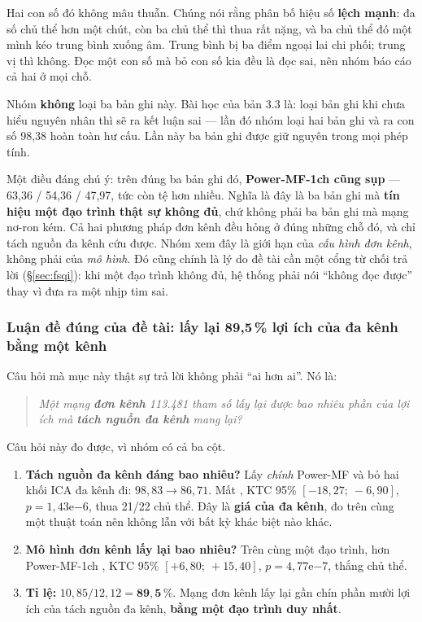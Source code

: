 Hai con số đó không mâu thuẫn. Chúng nói rằng phân bố hiệu số \textbf{lệch mạnh}: đa số chủ thể
\hethong{} hơn một chút, còn ba chủ thể thì thua rất nặng, và ba chủ thể đó một mình kéo trung bình
xuống âm. Trung bình bị ba điểm ngoại lai chi phối; trung vị thì không. Đọc một con số mà bỏ con số kia
đều là đọc sai, nên nhóm báo cáo cả hai ở mọi chỗ.

Nhóm \textbf{không} loại ba bản ghi này. Bài học của bản 3.3 là: loại bản ghi khi chưa hiểu nguyên nhân
thì sẽ ra kết luận sai --- lần đó nhóm loại hai bản ghi và ra con số 98,38 hoàn toàn hư cấu. Lần này ba
bản ghi được giữ nguyên trong mọi phép tính.

Một điều đáng chú ý: trên đúng ba bản ghi đó, \textbf{Power-MF-1ch cũng sụp} --- 63,36 / 54,36 / 47,97,
tức còn tệ hơn \hethong{} nhiều. Nghĩa là đây là ba bản ghi mà \textbf{tín hiệu một đạo trình thật sự
không đủ}, chứ không phải ba bản ghi mà mạng nơ-ron kém. Cả hai phương pháp đơn kênh đều hỏng ở đúng
những chỗ đó, và chỉ tách nguồn đa kênh cứu được. Nhóm xem đây là giới hạn của \textit{cấu hình đơn
kênh}, không phải của \textit{mô hình}. Đó cũng chính là lý do đề tài cần một cổng từ chối trả lời
(\S\ref{sec:fsqi}): khi một đạo trình không đủ, hệ thống phải nói ``không đọc được'' thay vì đưa ra một
nhịp tim sai.

\subsubsection{Luận đề đúng của đề tài: lấy lại 89,5\,\% lợi ích của đa kênh bằng một kênh}
\label{sec:luande}

Câu hỏi mà mục này thật sự trả lời không phải ``ai hơn ai''. Nó là:

\begin{quote}
\textit{Một mạng \textbf{đơn kênh} 113.481 tham số lấy lại được bao nhiêu phần của lợi ích mà
\textbf{tách nguồn đa kênh} mang lại?}
\end{quote}

Câu hỏi này đo được, vì nhóm có cả ba cột.

\begin{enumerate}[leftmargin=1.8em,itemsep=5pt]
\item \textbf{Tách nguồn đa kênh đáng bao nhiêu?} Lấy \textit{chính} Power-MF và bỏ hai khối ICA đa kênh
đi: $98{,}83 \rightarrow 86{,}71$. Mất , KTC 95\% $[-18{,}27;\ -6{,}90]$,
$p = 1{,}43\mathrm{e}{-6}$, thua 21/22 chủ thể. Đây là \textbf{giá của đa kênh}, đo trên cùng một thuật
toán nên không lẫn với bất kỳ khác biệt nào khác.
\item \textbf{Mô hình đơn kênh lấy lại bao nhiêu?} Trên cùng một đạo trình, \hethong{} hơn Power-MF-1ch
, KTC 95\% $[+6{,}80;\ +15{,}40]$, $p = 4{,}77\mathrm{e}{-7}$, thắng  chủ
thể.
\item \textbf{Tỉ lệ:} $10{,}85 / 12{,}12 = \mathbf{89{,}5\,\%}$. Mạng đơn kênh lấy lại gần chín phần
mười lợi ích của tách nguồn đa kênh, \textbf{bằng một đạo trình duy nhất}.
\end{enumerate}

